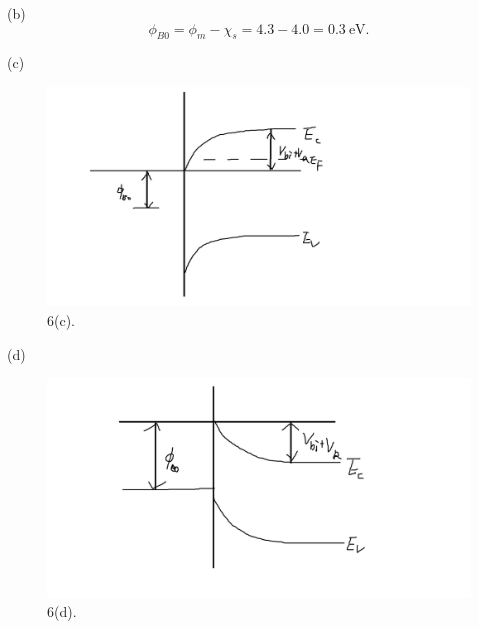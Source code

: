 \documentclass[a4paper]{article}
\begin{document}
(b)
$$\phi_{B0}=\phi_m-\chi_s=4.3-4.0=0.3\ \mathrm{eV}.$$

(c)
\begin{figure}[H]
    \centering
    \includegraphics[width=1\textwidth]{3.png}
    \caption{6(c).}
\end{figure}

(d)
\begin{figure}[H]
    \centering
    \includegraphics[width=1\textwidth]{4.png}
    \caption{6(d).}
\end{figure}
\end{document}
